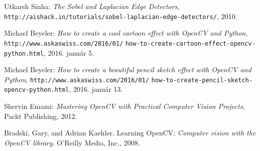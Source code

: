\begin{thebibliography}{x}
Utkarsh Sinha: \emph{The Sobel and Laplacian Edge Detectors}, \texttt{http://aishack.in/tutorials/sobel-laplacian-edge-detectors/}, 2010.

 Michael Beyeler: \emph{How to create a cool cartoon effect with OpenCV and Python}, \texttt{http://www.askaswiss.com/2016/01/} \texttt{how-to-create-cartoon-effect-opencv-python.html}, 2016. január 5.

 Michael Beyeler: \emph{How to create a beautiful pencil sketch effect with OpenCV and Python}, \texttt{http://www.askaswiss.com/2016/01/} \texttt{how-to-create-pencil-sketch-opencv-python.html}, 2016. január 13.

 Shervin Emami: \emph{Mastering OpenCV with Practical Computer Vision Projects}, Packt Publishing, 2012.

Bradski, Gary, and Adrian Kaehler. Learning OpenCV: \emph{Computer vision with the OpenCV library}. O'Reilly Media, Inc., 2008.


\end{thebibliography}
